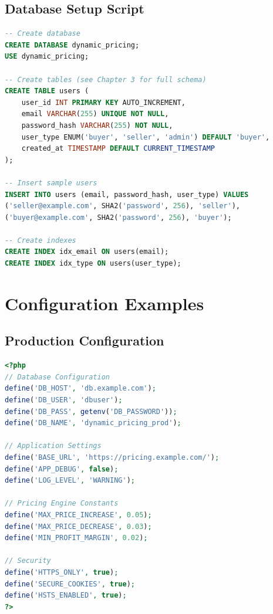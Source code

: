 \documentclass[12pt,a4paper,oneside]{report}
\begin{document}
\section{Database Setup Script}

\begin{lstlisting}[language=SQL, caption=Database Initialization Script]
-- Create database
CREATE DATABASE dynamic_pricing;
USE dynamic_pricing;

-- Create tables (see Chapter 3 for full schema)
CREATE TABLE users (
    user_id INT PRIMARY KEY AUTO_INCREMENT,
    email VARCHAR(255) UNIQUE NOT NULL,
    password_hash VARCHAR(255) NOT NULL,
    user_type ENUM('buyer', 'seller', 'admin') DEFAULT 'buyer',
    created_at TIMESTAMP DEFAULT CURRENT_TIMESTAMP
);

-- Insert sample users
INSERT INTO users (email, password_hash, user_type) VALUES
('seller@example.com', SHA2('password', 256), 'seller'),
('buyer@example.com', SHA2('password', 256), 'buyer');

-- Create indexes
CREATE INDEX idx_email ON users(email);
CREATE INDEX idx_type ON users(user_type);
\end{lstlisting}

\chapter{Configuration Examples}

\section{Production Configuration}

\begin{lstlisting}[language=PHP, caption=Production config.php]
<?php
// Database Configuration
define('DB_HOST', 'db.example.com');
define('DB_USER', 'dbuser');
define('DB_PASS', getenv('DB_PASSWORD'));
define('DB_NAME', 'dynamic_pricing_prod');

// Application Settings
define('BASE_URL', 'https://pricing.example.com/');
define('APP_DEBUG', false);
define('LOG_LEVEL', 'WARNING');

// Pricing Engine Constants
define('MAX_PRICE_INCREASE', 0.05);
define('MAX_PRICE_DECREASE', 0.03);
define('MIN_PROFIT_MARGIN', 0.02);

// Security
define('HTTPS_ONLY', true);
define('SECURE_COOKIES', true);
define('HSTS_ENABLED', true);
?>
\end{lstlisting}
\end{document}
